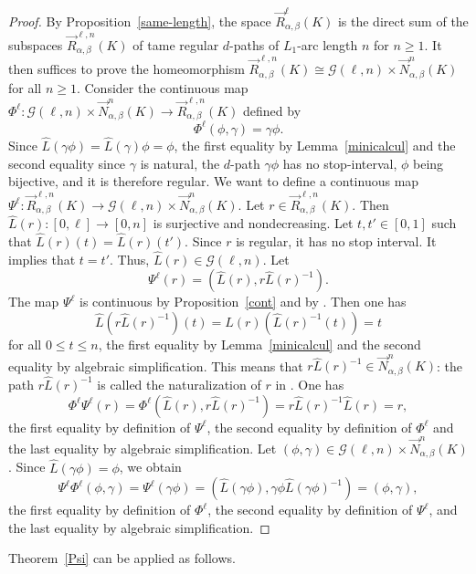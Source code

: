 \documentclass[a4paper,12pt]{amsart}
\newcommand{\p}{\times}
\renewcommand{\vec}{\overrightarrow}
\newcommand{\bpf}{\begin{proof}}
\newcommand{\epf}{\end{proof}}
\theoremstyle{definition}
\newcommand{\iso}{\cong}
\renewcommand{\leq}{\leqslant}
\renewcommand{\geq}{\geqslant}
\begin{document}
\bpf
By Proposition~\ref{same-length}, the space $\vec{R}_{\alpha,\beta}^{\ell}(K)$ is the direct sum of the subspaces $\vec{R}_{\alpha,\beta}^{\ell,n}(K)$ of tame regular $d$-paths of $L_1$-arc length $n$ for $n\geq 1$. It then suffices to prove the homeomorphism $\vec{R}_{\alpha,\beta}^{\ell,n}(K) \iso \mathcal{G}(\ell,n) \p \vec{N}_{\alpha,\beta}^n(K)$ for all $n\geq 1$. Consider the continuous map $\Phi^{\ell}:\mathcal{G}(\ell,n)\p \vec{N}_{\alpha,\beta}^n(K) \to \vec{R}_{\alpha,\beta}^{\ell,n}(K)$ defined by \[\Phi^{\ell}(\phi,\gamma)=\gamma\phi.\] Since $\widehat{L}(\gamma\phi)=\widehat{L}(\gamma)\phi=\phi$, the first equality by Lemma~\ref{minicalcul} and the second equality since $\gamma$ is natural, the $d$-path $\gamma\phi$ has no stop-interval, $\phi$ being bijective, and it is therefore regular. We want to define a continuous map $\Psi^{\ell}:\vec{R}_{\alpha,\beta}^{\ell,n}(K)\to \mathcal{G}(\ell,n)\p \vec{N}_{\alpha,\beta}^n(K)$. Let $r\in \vec{R}_{\alpha,\beta}^{\ell,n}(K)$. Then $\widehat{L}(r):[0,\ell] \to [0,n]$ is surjective and nondecreasing. Let $t,t'\in [0,1]$ such that $\widehat{L}(r)(t)=\widehat{L}(r)(t')$. Since $r$ is regular, it has no stop interval. It implies that $t=t'$. Thus, $\widehat{L}(r)\in \mathcal{G}(\ell,n)$. Let \[\Psi^{\ell}(r)=(\widehat{L}(r),r\widehat{L}(r)^{-1}).\] The map $\Psi^{\ell}$ is continuous by Proposition~\ref{cont} and by \cite[Lemma~6.2]{Moore2}. Then one has \[\widehat{L}(r\widehat{L}(r)^{-1})(t)=\widehat{L}(r)(\widehat{L}(r)^{-1}(t)) = t\] for all $0\leq t \leq n$, the first equality by Lemma~\ref{minicalcul} and the second equality by algebraic simplification. This means that $r\widehat{L}(r)^{-1}\in \vec{N}_{\alpha,\beta}^n(K)$: the path $r\widehat{L}(r)^{-1}$ is called the naturalization of $r$ in \cite[Definition~2.14]{MR2521708}. One has \[\Phi^{\ell}\Psi^{\ell}(r)=\Phi^{\ell}(\widehat{L}(r),r\widehat{L}(r)^{-1})= r\widehat{L}(r)^{-1}\widehat{L}(r) = r,\] the first equality by definition of $\Psi^{\ell}$, the second equality by definition of $\Phi^{\ell}$ and the last equality by algebraic simplification. Let $(\phi,\gamma)\in \mathcal{G}(\ell,n) \p \vec{N}_{\alpha,\beta}^n(K)$. Since $\widehat{L}(\gamma\phi) = \phi$, we obtain \[\Psi^{\ell}\Phi^{\ell}(\phi,\gamma)=\Psi^{\ell}(\gamma\phi) = (\widehat{L}(\gamma\phi),\gamma\phi\widehat{L}(\gamma\phi)^{-1}) = (\phi,\gamma),\]
the first equality by definition of $\Phi^{\ell}$, the second equality by definition of $\Psi^{\ell}$, and the last equality by algebraic simplification.
\epf

Theorem~\ref{Psi} can be applied as follows. 
\end{document}
